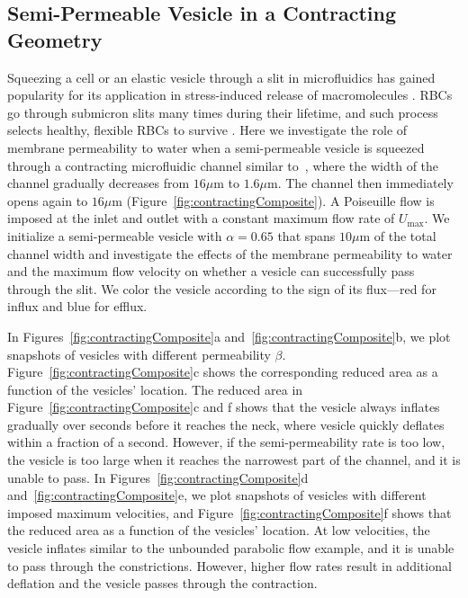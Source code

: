 \documentclass[9pt,twocolumn,twoside,lineno]{pnas-new}
\begin{document}
\subsection*{Semi-Permeable Vesicle in a Contracting Geometry} 
Squeezing a cell or an elastic vesicle through a slit in microfluidics has gained popularity for its application in stress-induced release of macromolecules
\cite{ShareiEtAl2013_PNAS,Pak2015_PNAS,ZhangShenHoganBarakatMisbah2018_BJ,LuoBai2019_PoF}. RBCs go through submicron slits many times during their lifetime, and such process selects healthy, flexible RBCs to survive \cite{wu2015critical,LuPeng2019_PoF}.
Here we investigate the role of membrane permeability to water when a semi-permeable vesicle is squeezed through a contracting microfluidic channel similar to~\cite{wu2015critical},
where the width of the channel gradually decreases from $16 \mu$m to $1.6 \mu$m. The channel then immediately opens
again to $16 \mu$m (Figure~\ref{fig:contractingComposite}). A
Poiseuille flow is imposed at the inlet and outlet with a constant maximum flow
rate of $U_{\max}$. We initialize a semi-permeable vesicle with $\alpha
= 0.65$ that spans $10 \mu$m of the total channel width and investigate
the effects of the membrane permeability to water and the maximum flow velocity on whether a vesicle can successfully pass through the slit. 
We color the vesicle according to the sign of its flux---red for influx and blue for efflux.

In Figures~\ref{fig:contractingComposite}a
and~\ref{fig:contractingComposite}b, we plot snapshots of vesicles with
different permeability $\beta$. 
Figure~\ref{fig:contractingComposite}c
shows the corresponding reduced area as a function of the vesicles' location. 
The reduced area in Figure~\ref{fig:contractingComposite}c and f shows that the vesicle always inflates gradually over seconds
before it reaches the neck, where vesicle quickly deflates within a fraction of a second.
However, if the
semi-permeability rate is too low, the vesicle is too large when it
reaches the narrowest part of the channel, and it is unable to pass. In
Figures~\ref{fig:contractingComposite}d
and~\ref{fig:contractingComposite}e, we plot snapshots of vesicles with
different imposed maximum velocities, and
Figure~\ref{fig:contractingComposite}f shows that the reduced area as a
function of the vesicles' location. At low velocities, the vesicle
inflates similar to the unbounded parabolic flow example, and it is
unable to pass through the constrictions. However, higher flow rates
result in additional deflation and the vesicle passes through the
contraction.
\end{document}
